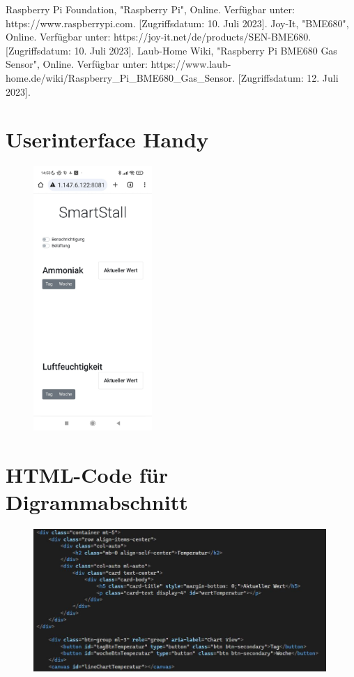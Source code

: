 \documentclass[conference]{IEEEtran}
\begin{document}
\begin{thebibliography}{00}
Raspberry Pi Foundation, "Raspberry Pi", Online. Verfügbar unter: https://www.raspberrypi.com. [Zugriffsdatum: 10. Juli 2023].
Joy-It, "BME680", Online. Verfügbar unter: https://joy-it.net/de/products/SEN-BME680. [Zugriffsdatum: 10. Juli 2023].
Laub-Home Wiki, "Raspberry Pi BME680 Gas Sensor", Online. Verfügbar unter: https://www.laub-home.de/wiki/Raspberry\_Pi\_BME680\_Gas\_Sensor. [Zugriffsdatum: 12. Juli 2023].
\end{thebibliography}
\clearpage
\begin{appendices}
\section{Userinterface Handy}
\label{sec:uiHandyAnhang}
\begin{figure}[h]
    \centering
    \includegraphics[width=0.4\textwidth]{fig/uiHandy.jpg}
\end{figure}

\clearpage

\section{HTML-Code für Digrammabschnitt}
\label{sec:htmlCodeDiagrammAnhang}
\begin{figure}[h]
    \centering
    \includegraphics[width=0.99\textwidth]{fig/htmlcode.JPG}
\end{figure}


\end{appendices}
\end{document}
